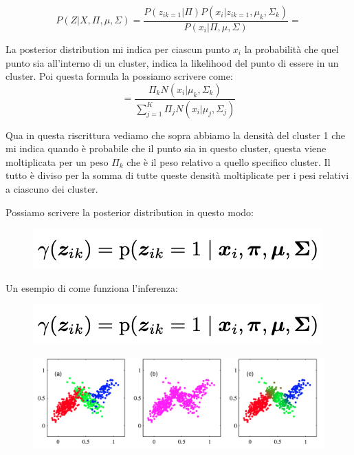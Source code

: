\documentclass[14pt]{extreport}
\begin{document}
$$P(Z|X,\Pi, \mu, \Sigma) = \frac{P(z_{ik=1}|\Pi)P(x_i|z_{ik=1},\mu_k,\Sigma_k)}{P(x_i|\Pi,\mu, \Sigma)} = $$

La posterior distribution mi indica per ciascun punto $x_i$ la probabilità che quel punto sia all'interno di un cluster, indica la likelihood del
punto di essere in un cluster. Poi questa formula la possiamo scrivere come:
$$= \frac{\Pi_k N(x_i|\mu_k, \Sigma_k)}{\sum_{j=1}^K \Pi_j N(x_i | \mu_j, \Sigma_j)}$$

Qua in questa riscrittura vediamo che sopra abbiamo la densità del cluster 1 che mi indica quando è probabile che il punto sia in questo cluster,
questa viene moltiplicata per un peso $\Pi_k$ che è il peso relativo a quello specifico cluster. Il tutto è diviso per la somma di tutte queste
densità moltiplicate per i pesi relativi a ciascuno dei cluster.

Possiamo scrivere la posterior distribution in questo modo:

\begin{figure}[H]
	\centering
	\includegraphics[width=0.7\linewidth]{546.jpeg}
\end{figure}

Un esempio di come funziona l'inferenza:


\begin{figure}[H]
	\centering
	\includegraphics[width=0.7\linewidth]{546.jpeg}
\end{figure}



\begin{figure}[H]
	\centering
	\includegraphics[width=0.7\linewidth]{575.jpeg}
\end{figure}
\end{document}
